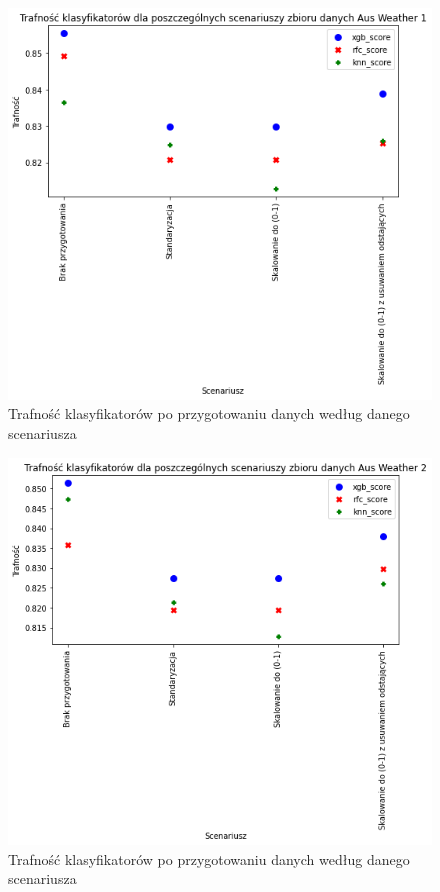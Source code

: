 \documentclass{book}
\begin{document}
\begin{figure}[H]
\centerline{\includegraphics{Aus_Weather_1_Standaryzacja}}
\centering
\caption{Trafność klasyfikatorów po przygotowaniu danych 
według danego scenariusza}
\end{figure}

\begin{figure}[H]
\centerline{\includegraphics{Aus_Weather_2_Standaryzacja}}
\centering
\caption{Trafność klasyfikatorów po przygotowaniu danych 
według danego scenariusza}
\end{figure}
\end{document}
